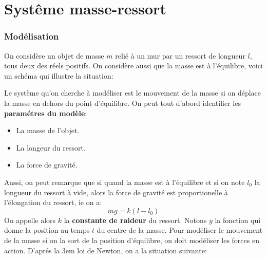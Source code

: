 \chapter{Systême masse-ressort}
   \subsection{Modélisation}
      On considère un objet de masse \(m\) relié à un mur par un ressort de longueur \(l\), tous deux des réels positifs. On considère aussi que la masse est à l'équilibre, voici un schéma qui illustre la situation:
      \begin{center}
      \end{center}
   Le système qu'on cherche à modéliser est le mouvement de la masse si on déplace la masse en dehors du point d'équilibre. On peut tout d'abord identifier les \textbf{paramétres du modèle}:
   \begin{itemize}
      \item La masse de l'objet.
      \item La longeur du ressort.
      \item La force de gravité.
   \end{itemize}
   Aussi, on peut remarque que si quand la masse est à l'équilibre et si on note \(l_0\) la longueur du ressort à vide, alors la force de gravité est proportionelle à l'élongation du ressort, ie on a:
   \[
      mg = k(l - l_0)
   \]
   On appelle alors \(k\) la \textbf{constante de raideur} du ressort. Notons \(y\) la fonction qui donne la position au temps \(t\) du centre de la masse. Pour modéliser le mouvement de la masse si on la sort de la position d'équilibre, on doit modéliser les forces en action.  D'aprés la 3em loi de Newton, on a la situation suivante:
